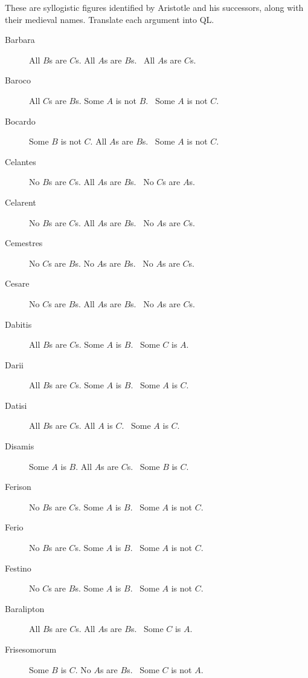 \problempart
\label{pr.BarbaraEtc}
These are syllogistic figures identified by Aristotle and his successors, along with their medieval names. Translate each argument into QL.
\begin{description}
\item[Barbara] All $B$s are $C$s. All $A$s are $B$s.
	\therefore\  All $A$s are $C$s.
\item[Baroco] All $C$s are $B$s. Some $A$ is not $B$.
	\therefore\  Some $A$ is not $C$.
\item[Bocardo] Some $B$ is not $C$. All $A$s are $B$s.
	\therefore\  Some $A$ is not $C$.
\item[Celantes] No $B$s are $C$s. All $A$s are $B$s.
	\therefore\  No $C$s are $A$s.
\item[Celarent] No $B$s are $C$s. All $A$s are $B$s.
	\therefore\  No $A$s are $C$s.
\item[Cemestres] No $C$s are $B$s. No $A$s are $B$s.
	\therefore\  No $A$s are $C$s.
\item[Cesare] No $C$s are $B$s. All $A$s are $B$s.
	\therefore\  No $A$s are $C$s.
\item[Dabitis] All $B$s are $C$s. Some $A$ is $B$.
	\therefore\  Some $C$ is $A$.
\item[Darii] All $B$s are $C$s. Some $A$ is $B$.
	\therefore\  Some $A$ is $C$.
\item[Datisi] All $B$s are $C$s. All $A$ is $C$.
	\therefore\  Some $A$ is $C$.
\item[Disamis] Some $A$ is $B$. All $A$s are $C$s.
	\therefore\  Some $B$ is $C$.
\item[Ferison] No $B$s are $C$s. Some $A$ is $B$.
	\therefore\  Some $A$ is not $C$.
\item[Ferio] No $B$s are $C$s. Some $A$ is $B$.
	\therefore\  Some $A$ is not $C$.
\item[Festino] No $C$s are $B$s. Some $A$ is $B$.
	\therefore\  Some $A$ is not $C$.
\item[Baralipton] All $B$s are $C$s. All $A$s are $B$s.
	\therefore\  Some $C$ is $A$.
\item[Frisesomorum] Some $B$ is $C$. No $A$s are $B$s.
	\therefore\  Some $C$ is not $A$.
\end{description}


